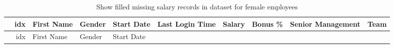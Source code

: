 \documentclass [oneside,10pt,a4paper,ngerman,BCOR10mm,headsepline,parindent,final]{scrartcl}
\begin{document}
    \begin{longtable}[]{@{}rrllllrrll@{}}
\caption{Show filled missing salary records in dataset for female
employees}\tabularnewline
\toprule
\begin{minipage}[b]{0.02\columnwidth}\raggedleft
\strut
\end{minipage} & \begin{minipage}[b]{0.04\columnwidth}\raggedleft
idx\strut
\end{minipage} & \begin{minipage}[b]{0.08\columnwidth}\raggedright
First Name\strut
\end{minipage} & \begin{minipage}[b]{0.06\columnwidth}\raggedright
Gender\strut
\end{minipage} & \begin{minipage}[b]{0.08\columnwidth}\raggedright
Start Date\strut
\end{minipage} & \begin{minipage}[b]{0.11\columnwidth}\raggedright
Last Login Time\strut
\end{minipage} & \begin{minipage}[b]{0.06\columnwidth}\raggedleft
Salary\strut
\end{minipage} & \begin{minipage}[b]{0.07\columnwidth}\raggedleft
Bonus \%\strut
\end{minipage} & \begin{minipage}[b]{0.12\columnwidth}\raggedright
Senior Management\strut
\end{minipage} & \begin{minipage}[b]{0.08\columnwidth}\raggedright
Team\strut
\end{minipage}\tabularnewline
\midrule
\endfirsthead
\toprule
\begin{minipage}[b]{0.02\columnwidth}\raggedleft
\strut
\end{minipage} & \begin{minipage}[b]{0.04\columnwidth}\raggedleft
idx\strut
\end{minipage} & \begin{minipage}[b]{0.08\columnwidth}\raggedright
First Name\strut
\end{minipage} & \begin{minipage}[b]{0.06\columnwidth}\raggedright
Gender\strut
\end{minipage} & \begin{minipage}[b]{0.08\columnwidth}\raggedright
Start Date\strut
\end{minipage} & \begin{minipage}[b]{0.11\columnwidth}\raggedright

\end{minipage}
\end{longtable}
\end{document}
